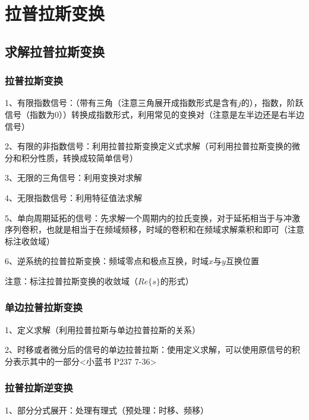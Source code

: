 \chapter{拉普拉斯变换}

\section{求解拉普拉斯变换}



\subsection{拉普拉斯变换}

1、有限指数信号：（带有三角（注意三角展开成指数形式是含有$j$的），指数，阶跃信号（指数为0））转换成指数形式，利用常见的变换对（注意是左半边还是右半边信号）

2、有限的非指数信号：利用拉普拉斯变换定义式求解（可利用拉普拉斯变换的微分和积分性质，转换成较简单信号）

3、无限的三角信号：利用变换对求解

4、无限指数信号：利用特征值法求解

5、单向周期延拓的信号：先求解一个周期内的拉氏变换，对于延拓相当于与冲激序列卷积，也就是相当于在频域频移，时域的卷积和在频域求解乘积和即可（注意标注收敛域）

6、逆系统的拉普拉斯变换：频域零点和极点互换，时域$x$与$y$互换位置

注意：标注拉普拉斯变换的收敛域（$Re\{s\}$的形式）



\subsection{单边拉普拉斯变换}

1、定义求解（利用拉普拉斯与单边拉普拉斯的关系）

2、时移或者微分后的信号的单边拉普拉斯：使用定义求解，可以使用原信号的积分表示其中的一部分<小蓝书 P237 7-36>



\subsection{拉普拉斯逆变换}

1、部分分式展开：处理有理式（预处理：时移、频移）

